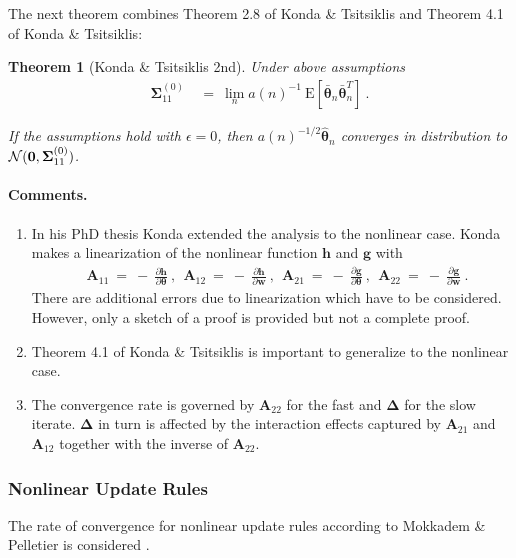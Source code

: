 \documentclass{article}
\newtheorem{theorem}{Theorem}
\newcommand\Bg{\bm{g}}
\newcommand\Bh{\bm{h}}
\newcommand\Bw{\bm{w}}
\newcommand\BA{\bm{A}}
\newcommand\Bth{\bm{\theta}}
\newcommand\BDe{\bm{\Delta}}
\newcommand\BSi{\bm{\Sigma}}
\newcommand\BZe{\bm{0}}
\newcommand{\rE}{\mathrm{E}} \newcommand{\rF}{\mathrm{F}}
\begin{document}
The next theorem combines Theorem 2.8 of Konda \& Tsitsiklis
and Theorem 4.1 of Konda \& Tsitsiklis:
\begin{theorem}[Konda \& Tsitsiklis 2nd]
\label{th:kondaRate2}
Under above assumptions
\begin{align}
\BSi_{11}^{(0)} \ &= \ \lim_{n} a(n)^{-1} \
\rE\left[ \bar{\Bth}_n  \bar{\Bth}_n^T \right] \ .
\end{align}

If the assumptions hold with $\epsilon=0$, then
$a(n)^{-1/2}\hat{\Bth}_n$ converges in distribution to
$\cN(\BZe,\BSi_{11}^{(0)})$.
\end{theorem}


\paragraph{Comments.}
\begin{enumerate}[label=\textbf{(C\arabic*)}]
\item
In his PhD thesis \cite{Konda:02} Konda extended the analysis to the
nonlinear case.
Konda makes a linearization of the nonlinear function $\Bh$ and $\Bg$ with
\begin{align}
& \BA_{11} \ = \ - \ \frac{\partial \Bh}{\partial \Bth} \ , \ \
\BA_{12} \ = \ - \ \frac{\partial \Bh}{\partial \Bw}  \  , \ \
\BA_{21} \ = \ - \ \frac{\partial \Bg}{\partial \Bth}  \ , \ \
\BA_{22} \ = \ - \ \frac{\partial \Bg}{\partial \Bw} \ .
\end{align}
There are additional errors due to linearization which have to be
considered.
However, only a sketch of a proof is provided but not a complete proof.

\item
Theorem 4.1 of Konda \& Tsitsiklis is important to generalize to the
nonlinear case.

\item
The convergence rate is governed by
$\BA_{22}$ for the fast and $\BDe$
for the slow iterate.
$\BDe$ in turn is affected by the interaction effects
captured by $\BA_{21}$ and $\BA_{12}$ together with the inverse of
$\BA_{22}$.

\end{enumerate}


\subsubsection{Nonlinear Update Rules}
\label{sec:nonlinur}
The rate of convergence for nonlinear update rules according to
Mokkadem \& Pelletier is considered \cite{Mokkadem:06}.
\end{document}
